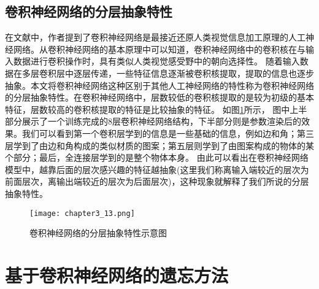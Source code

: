 \subsection{卷积神经网络的分层抽象特性}
在文献\cite{2019arXiv190906161K}中，作者提到了卷积神经网络是最接近还原人类视觉信息加工原理的人工神经网络。从卷积神经网络的基本原理中可以知道，卷积神经网络中的卷积核在与输入数据进行卷积操作时，具有类似人类视觉感受野中的朝向选择性。
随着输入数据在多层卷积层中逐层传递，一些特征信息逐渐被卷积核提取，提取的信息也逐步抽象。本文将卷积神经网络这种区别于其他人工神经网络的特性称为卷积神经网络的分层抽象特性。在卷积神经网络中，层数较低的卷积核提取的是较为初级的基本特征，层数较高的卷积核提取的特征是比较抽象的特征。
如图\ref{fig:chapter3_13}所示， 图中上半部分展示了一个训练完成的8层卷积神经网络结构，下半部分则是参数渲染后的效果。我们可以看到第一个卷积层学到的信息是一些基础的信息，例如边和角；第三层学到了由边和角构成的类似材质的图案；第五层则学到了由图案构成的物体的某个部分；最后，全连接层学到的是整个物体本身。
由此可以看出在卷积神经网络模型中，越靠后面的层次感兴趣的特征越抽象(这里我们称离输入端较近的层次为前面层次，离输出端较近的层次为后面层次)，这种现象就解释了我们所说的分层抽象特性。
\begin{figure}
    \centering
    \texttt{[image: chapter3\_13.png]}
    \caption{卷积神经网络的分层抽象特性示意图\cite{luyujie2018}}
    \label{fig:chapter3_13}
\end{figure}

\section{基于卷积神经网络的遗忘方法}
